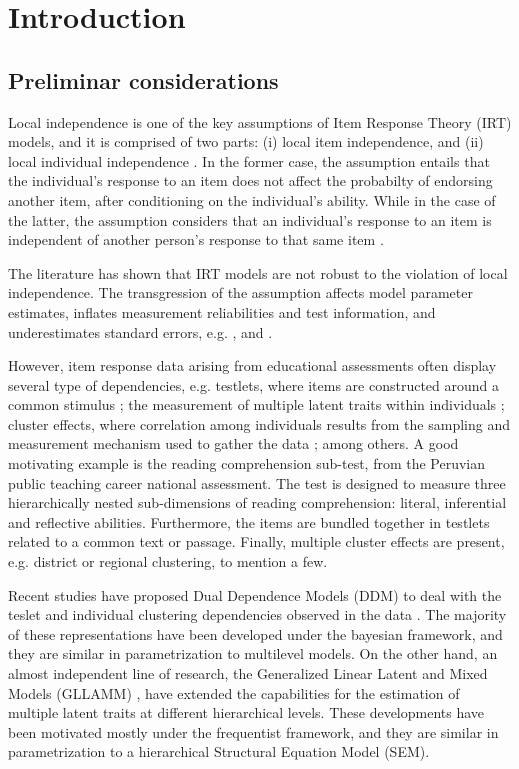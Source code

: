 \chapter{Introduction}

\section{Preliminar considerations}

Local independence is one of the key assumptions of Item Response Theory (IRT) models, and it is comprised of two parts: (i) local item independence, and (ii) local individual independence \cite{Baker_2001, Hambleton_et_al_1991a}. In the former case, the assumption entails that the individual's response to an item does not affect the probabilty of endorsing another item, after conditioning on the individual's ability. While in the case of the latter, the assumption considers that an individual's response to an item is independent of another person's response to that same item \cite{Reckase_2009}. 

The literature has shown that IRT models are not robust to the violation of local independence. The transgression of the assumption affects model parameter estimates, inflates measurement reliabilities and test information, and underestimates standard errors, e.g. \citet{Yen_1984, Chen_et_al_1997}, and  \citet{Jiao_et_al_2012}. 

However, item response data arising from educational assessments often display several type of dependencies, e.g. testlets, where items are constructed around a common stimulus \cite{Wainer_et_al_2007}; the measurement of multiple latent traits within individuals \cite{Reckase_2009}; cluster effects, where correlation among individuals results from the sampling and measurement mechanism used to gather the data \cite{Raudenbush_et_al_2002}; among others. A good motivating example is the reading comprehension sub-test, from the Peruvian public teaching career national assessment. The test is designed to measure three hierarchically nested sub-dimensions of reading comprehension: literal, inferential and reflective abilities. Furthermore, the items are bundled together in testlets related to a common text or passage. Finally, multiple cluster effects are present, e.g. district or regional clustering, to mention a few.

Recent studies have proposed Dual Dependence Models (DDM) to deal with the teslet and individual clustering dependencies observed in the data \cite{Fujimoto_2020, Fujimoto_2018a, Fujimoto_2018b, Jiao_et_al_2012, Flores_2012, Fox_2010, Reckase_2009, Bradlow_1999}. The majority of these representations have been developed under the bayesian framework, and they are similar in parametrization to multilevel models. On the other hand, an almost independent line of research, the Generalized Linear Latent and Mixed Models (GLLAMM) \cite{Rabe_et_al_2004a, Rabe_et_al_2004b, Skrondal_et_al_2004a, Rabe_et_al_2012}, have extended the capabilities for the estimation of multiple latent traits at different hierarchical levels. These developments have been motivated mostly under the frequentist framework, and they are similar in parametrization to a hierarchical Structural Equation Model (SEM).

